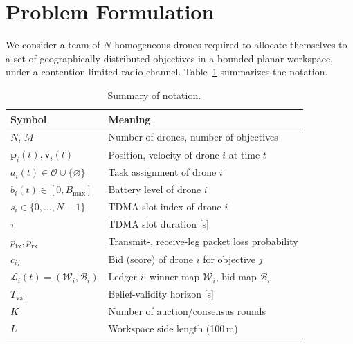\section{Problem Formulation}\label{sec:formulation}

We consider a team of $N$ homogeneous drones required to allocate themselves to a set of geographically distributed objectives in a bounded planar workspace, under a contention-limited radio channel. Table~\ref{tab:notation} summarizes the notation.

\begin{table}[t]
\centering
\caption{Summary of notation.}
\label{tab:notation}
\begin{tabular}{@{}ll@{}}
\toprule
Symbol & Meaning \\
\midrule
$N$, $M$ & Number of drones, number of objectives \\
$\mathbf{p}_i(t), \mathbf{v}_i(t)$ & Position, velocity of drone $i$ at time $t$ \\
$a_i(t) \in \mathcal{O} \cup \{\varnothing\}$ & Task assignment of drone $i$ \\
$b_i(t) \in [0, B_{\max}]$ & Battery level of drone $i$ \\
$s_i \in \{0,\dots,N{-}1\}$ & TDMA slot index of drone $i$ \\
$\tau$ & TDMA slot duration [s] \\
$p_{\mathrm{tx}}, p_{\mathrm{rx}}$ & Transmit-, receive-leg packet loss probability \\
$c_{ij}$ & Bid (score) of drone $i$ for objective $j$ \\
$\mathcal{L}_i(t) = (\mathcal{W}_i, \mathcal{B}_i)$ & Ledger $i$: winner map $\mathcal{W}_i$, bid map $\mathcal{B}_i$ \\
$T_{\mathrm{val}}$ & Belief-validity horizon [s] \\
$K$ & Number of auction/consensus rounds \\
$L$ & Workspace side length (100\,m) \\
\bottomrule
\end{tabular}
\end{table}

